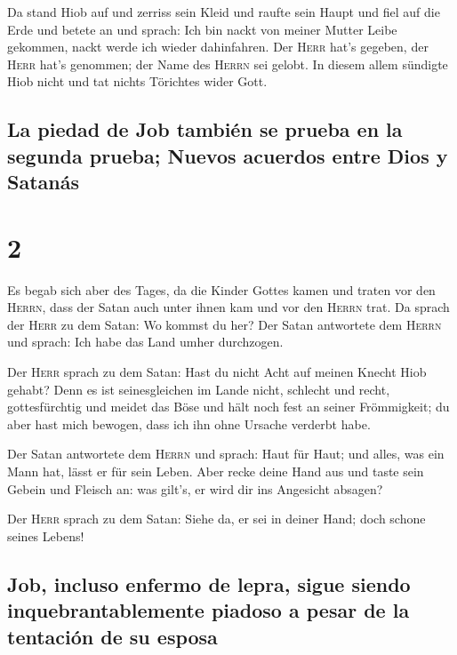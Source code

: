  Da stand Hiob auf und zerriss sein Kleid und raufte sein
Haupt und fiel auf die Erde und betete an  und sprach:
Ich bin nackt von meiner Mutter Leibe gekommen, nackt werde ich wieder
dahinfahren. Der \textsc{Herr} hat's gegeben, der \textsc{Herr} hat's
genommen; der Name des \textsc{Herrn} sei gelobt.  In
diesem allem sündigte Hiob nicht und tat nichts Törichtes wider Gott.

\hypertarget{la-piedad-de-job-tambiuxe9n-se-prueba-en-la-segunda-prueba-nuevos-acuerdos-entre-dios-y-satanuxe1s}{%
\subsection{La piedad de Job también se prueba en la segunda prueba;
Nuevos acuerdos entre Dios y
Satanás}\label{la-piedad-de-job-tambiuxe9n-se-prueba-en-la-segunda-prueba-nuevos-acuerdos-entre-dios-y-satanuxe1s}}

\hypertarget{section-1}{%
\section{2}\label{section-1}}

 Es begab sich aber des Tages, da die Kinder Gottes kamen
und traten vor den \textsc{Herrn}, dass der Satan auch unter ihnen kam
und vor den \textsc{Herrn} trat.  Da sprach der
\textsc{Herr} zu dem Satan: Wo kommst du her? Der Satan antwortete dem
\textsc{Herrn} und sprach: Ich habe das Land umher durchzogen.

 Der \textsc{Herr} sprach zu dem Satan: Hast du nicht Acht
auf meinen Knecht Hiob gehabt? Denn es ist seinesgleichen im Lande
nicht, schlecht und recht, gottesfürchtig und meidet das Böse und hält
noch fest an seiner Frömmigkeit; du aber hast mich bewogen, dass ich ihn
ohne Ursache verderbt habe.

 Der Satan antwortete dem \textsc{Herrn} und sprach: Haut
für Haut; und alles, was ein Mann hat, lässt er für sein Leben.
 Aber recke deine Hand aus und taste sein Gebein und
Fleisch an: was gilt's, er wird dir ins Angesicht absagen?

 Der \textsc{Herr} sprach zu dem Satan: Siehe da, er sei
in deiner Hand; doch schone seines Lebens!

\hypertarget{job-incluso-enfermo-de-lepra-sigue-siendo-inquebrantablemente-piadoso-a-pesar-de-la-tentaciuxf3n-de-su-esposa}{%
\subsection{Job, incluso enfermo de lepra, sigue siendo
inquebrantablemente piadoso a pesar de la tentación de su
esposa}\label{job-incluso-enfermo-de-lepra-sigue-siendo-inquebrantablemente-piadoso-a-pesar-de-la-tentaciuxf3n-de-su-esposa}}

